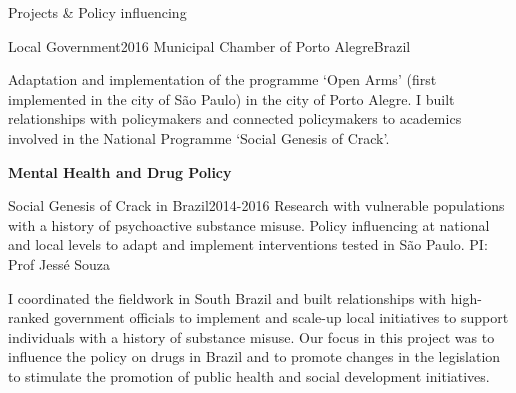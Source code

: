\begin{rSection}{Projects \& Policy influencing}
\begin{etaremune}
\begin{rSubsection}
{Local Government}{2016}
{Municipal Chamber of Porto Alegre}{Brazil}\par
{Adaptation and implementation of the programme `Open Arms' (first implemented in the city of São Paulo) in the city of Porto Alegre. I built relationships with policymakers and connected policymakers to academics involved in the National Programme `Social Genesis of Crack'.}
\end{rSubsection}

\vspace{1em}

\item  \textbf{Mental Health and Drug Policy}\par

\begin{rSubsection}
{Social Genesis of Crack in Brazil}{2014-2016}
{Research with vulnerable populations with a history of psychoactive substance misuse. Policy influencing at national and local levels to adapt and implement interventions tested in São Paulo. PI: Prof Jessé Souza}\par
{I coordinated the fieldwork in South Brazil and built relationships with high-ranked government officials to implement and scale-up local initiatives to support individuals with a history of substance misuse. Our focus in this project was to influence the policy on drugs in Brazil and to promote changes in the legislation to stimulate the promotion of public health and social development initiatives.}
\end{rSubsection}

\vspace{1em}

\end{etaremune}

\end{rSection}